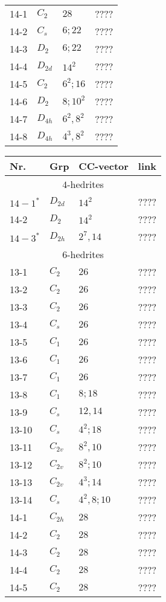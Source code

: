 \documentclass[12pt]{article}
\begin{document}
\begin{table}
\begin{center}
{\begin{minipage}{6cm}
\begin{tabular}{||l|l|l|l||}
14-1	&$C_2$	&$28$		&????\\
14-2	&$C_s$	&$6; 22$		&????\\
14-3	&$D_2$	&$6; 22$		&????\\
14-4	&$D_{2d}$	&$14^2$		&????\\
14-5	&$C_2$	&$6^2; 16$	&????\\
14-6	&$D_2$	&$8; 10^2$	&????\\
14-7	&$D_{4h}$	&$6^2, 8^2$	&????\\
14-8	&$D_{4h}$	&$4^3, 8^2$	&????\\\hline
\end{tabular}
\end{minipage}
\begin{minipage}[t]{6cm}
\begin{tabular}{||l|l|l|l||}
\hline
Nr.	&Grp 	&CC-vector	&link\\\hline
\multicolumn{4}{||c||}{$4$-hedrites}\\\hline
$14-1^*$&$D_{2d}$	&$14^2$		&????\\\hline
14-2	&$D_2$	&$14^2$		&????\\	
$14-3^*$&$D_{2h}$       &$2^7, 14$      &????\\
\hline
\multicolumn{4}{||c||}{$6$-hedrites}\\\hline
13-1	&$C_2$	&$26$		&????\\
13-2 	&$C_2$	&$26$		&????\\
13-3 	&$C_2$	&$26$		&????\\
13-4 	&$C_s$	&$26$		&????\\
13-5 	&$C_1$	&$26$		&????\\
13-6	&$C_1$	&$26$		&????\\
13-7	&$C_1$	&$26$		&????\\
13-8	&$C_1$	&$8; 18$		&????\\
13-9	&$C_s$	&$12, 14$		&????\\
13-10	&$C_s$	&$4^2; 18$	&????\\
13-11	&$C_{2v}$	&$8^2, 10$	&????\\
13-12	&$C_{2v}$	&$8^2; 10$	&????\\
13-13	&$C_{2v}$	&$4^3; 14$	&????\\
13-14	&$C_s$	&$4^2,8;10$	&????\\\hline
14-1 	&$C_{2h}$	&$28$		&????\\
14-2	&$C_{2}$	&$28$		&????\\
14-3	&$C_2$	&$28$		&????\\
14-4 	&$C_2$	&$28$		&????\\
14-5 	&$C_2$	&$28$		&????\\

\end{tabular}
\end{minipage}}
\end{center}
\end{table}
\end{document}
